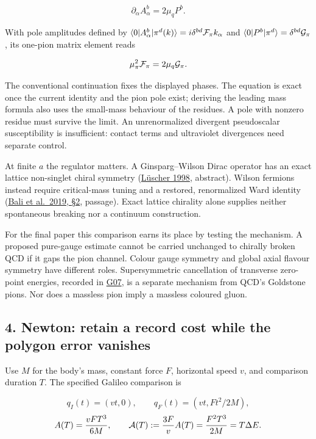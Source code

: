 \documentclass[11pt,a4paper]{article}
\begin{document}
\[\partial_\alpha A^b_\alpha=2\mu_q P^b.\]

With pole amplitudes defined by
\(\langle0|A^b_\alpha|\pi^d(k)\rangle=i\delta^{bd}{\cal F}_\pi k_\alpha\)
and \(\langle0|P^b|\pi^d\rangle=\delta^{bd}{\cal G}_\pi\), its one-pion
matrix element reads

\[\mu_\pi^2{\cal F}_\pi=2\mu_q{\cal G}_\pi.\]

The conventional continuation fixes the displayed phases. The equation
is exact once the current identity and the pion pole exist; deriving the
leading mass formula also uses the small-mass behaviour of the residues.
A pole with nonzero residue must survive the limit. An unrenormalized
divergent pseudoscalar susceptibility is insufficient: contact terms and
ultraviolet divergences need separate control.

At finite \(a\) the regulator matters. A Ginsparg--Wilson Dirac operator
has an exact lattice non-singlet chiral symmetry
(\href{https://arxiv.org/abs/hep-lat/9802011}{Lüscher 1998}, abstract).
Wilson fermions instead require critical-mass tuning and a restored,
renormalized Ward identity
(\href{https://doi.org/10.1140/epjc/s10052-019-7287-1}{Bali et al.~2019,
§2}, passage). Exact lattice chirality alone supplies neither
spontaneous breaking nor a continuum construction.

For the final paper this comparison earns its place by testing the
mechanism. A proposed pure-gauge estimate cannot be carried unchanged to
chirally broken QCD if it gaps the pion channel. Colour gauge symmetry
and global axial flavour symmetry have different roles. Supersymmetric
cancellation of transverse zero-point energies, recorded in
\href{low-dimensional-mass-gap.md}{G07}, is a separate mechanism from
QCD's Goldstone pions. Nor does a massless pion imply a massless
coloured gluon.

\hypertarget{newton-retain-a-record-cost-while-the-polygon-error-vanishes}{%
\subsection{4. Newton: retain a record cost while the polygon error
vanishes}\label{newton-retain-a-record-cost-while-the-polygon-error-vanishes}}

Use \(M\) for the body's mass, constant force \(F\), horizontal speed
\(v\), and comparison duration \(T\). The specified Galileo comparison
is

\[q_I(t)=(vt,0),\qquad q_F(t)=(vt,Ft^2/2M),\]
\[A(T)=\frac{vFT^3}{6M},\qquad
{\cal A}(T):=\frac{3F}{v}A(T)=\frac{F^2T^3}{2M}=T\Delta E.\]
\end{document}
